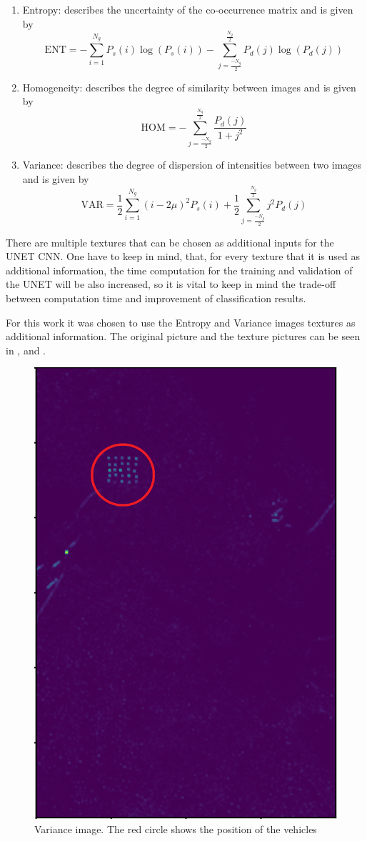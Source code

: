 \begin{enumerate}
    \item Entropy: describes the uncertainty of the co-occurrence matrix and is given by
    \begin{equation}
        \textrm{ENT} = -\sum_{i=1}^{N_g}P_s(i)\log(P_s(i)) - \sum_{j=\frac{-N_g}{2}}^{\frac{N_g}{2}} P_d(j)\log(P_d(j))
    \end{equation}
    
    \item Homogeneity: describes the degree of similarity between images and is given by
    \begin{equation}
        \textrm{HOM} = - \sum_{j=\frac{-N_g}{2}}^{\frac{N_g}{2}} \frac{P_d(j)}{1+j^2}
    \end{equation}
    
    \item Variance: describes the degree of dispersion of intensities between two images and is given by
    \begin{equation}
        \textrm{VAR} = \frac{1}{2} \sum_{i=1}^{N_g}(i-2\mu)^2 P_s(i) + 
         \frac{1}{2}\sum_{j=\frac{-N_g}{2}}^{\frac{N_g}{2}} j^2 P_d(j)
    \end{equation}
\end{enumerate}

There are multiple textures that can be chosen as additional inputs for the UNET CNN. One have to keep in mind, that, for every texture that it is used as additional information, 
the time computation for the training and validation of the UNET will be also increased, so it is vital to keep in mind the trade-off between computation time and improvement of classification results.

For this work it was chosen to use the Entropy and Variance images textures as additional information. The original picture and the texture pictures can be seen in ,  and .



\begin{figure}[ht]
    \centering
    \includegraphics[width=0.45\linewidth]{Chapter7/variance_exemplo.png}
    \caption{Variance image. The red circle shows the position of the vehicles}
    \label{fig:variance_example}
\end{figure}

